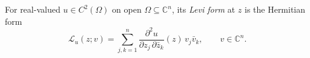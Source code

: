 
For real-valued $u\in C^2(\Omega)$ on open $\Omega\subseteq\mathbb C^n$, its \emph{Levi form} at $z$ is the Hermitian form
\[
\mathcal L_u(z;v)=\sum_{j,k=1}^n\frac{\partial^2 u}{\partial z_j\,\partial\bar z_k}(z)\,v_j\bar v_k,\qquad v\in\mathbb C^n.
\]
